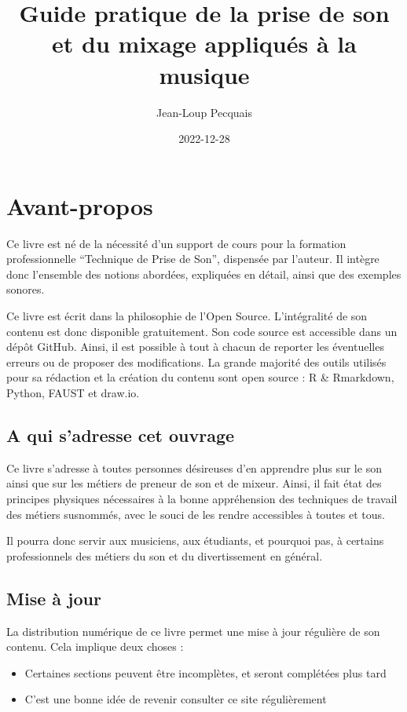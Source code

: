 \documentclass[
]{book}
\title{Guide pratique de la prise de son et du mixage appliqués à la musique}
\author{Jean-Loup Pecquais}
\date{2022-12-28}
\providecommand{\tightlist}{%
  \setlength{\itemsep}{0pt}\setlength{\parskip}{0pt}}
\begin{document}
\maketitle

{
\setcounter{tocdepth}{1}
\tableofcontents
}
\hypertarget{avant-propos}{%
\chapter{Avant-propos}\label{avant-propos}}

Ce livre est né de la nécessité d'un support de cours pour la formation professionnelle ``Technique de Prise de Son'', dispensée par l'auteur. Il intègre donc l'ensemble des notions abordées, expliquées en détail, ainsi que des exemples sonores.

Ce livre est écrit dans la philosophie de l'Open Source. L'intégralité de son contenu est donc disponible gratuitement. Son code source est accessible dans un dépôt GitHub. Ainsi, il est possible à tout à chacun de reporter les éventuelles erreurs ou de proposer des modifications. La grande majorité des outils utilisés pour sa rédaction et la création du contenu sont open source : R \& Rmarkdown, Python, FAUST et draw.io.

\hypertarget{a-qui-sadresse-cet-ouvrage}{%
\section{A qui s'adresse cet ouvrage}\label{a-qui-sadresse-cet-ouvrage}}

Ce livre s'adresse à toutes personnes désireuses d'en apprendre plus sur le son ainsi que sur les métiers de preneur de son et de mixeur. Ainsi, il fait état des principes physiques nécessaires à la bonne appréhension des techniques de travail des métiers susnommés, avec le souci de les rendre accessibles à toutes et tous.

Il pourra donc servir aux musiciens, aux étudiants, et pourquoi pas, à certains professionnels des métiers du son et du divertissement en général.

\hypertarget{mise-uxe0-jour}{%
\section{Mise à jour}\label{mise-uxe0-jour}}

La distribution numérique de ce livre permet une mise à jour régulière de son contenu. Cela implique deux choses :

\begin{itemize}
\tightlist
\item
  Certaines sections peuvent être incomplètes, et seront complétées plus tard
\item
  C'est une bonne idée de revenir consulter ce site régulièrement
\end{itemize}
\end{document}
